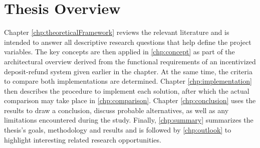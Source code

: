 
\section{Thesis Overview}
Chapter \ref{chp:theoreticalFramework} reviews the relevant literature and is intended to answer all descriptive research questions that help define the project variables. The key concepts are then applied in \autoref{chp:concept} as part of the architectural overview derived from the functional requirements of an incentivized deposit-refund system given earlier in the chapter. At the same time, the criteria to compare both implementations are determined. Chapter \ref{chp:implementation} then describes the procedure to implement each solution, after which the actual comparison may take place in \autoref{chp:comparison}. Chapter \ref{chp:conclusion} uses the results to draw a conclusion, discuss probable alternatives, as well as any limitations encountered during the study. Finally, \autoref{chp:summary} summarizes the thesis's goals, methodology and results and is followed by \autoref{chp:outlook} to highlight interesting related research opportunities.






